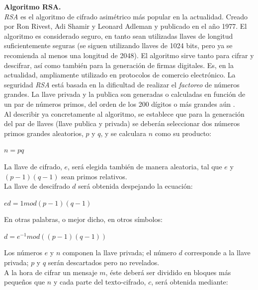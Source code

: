 \documentclass[12pt, a4paper, titlepage]{report}
\begin{document}
    		\textbf{Algoritmo RSA.}\\
    		\textit{RSA} es el algoritmo de cifrado asimétrico más popular en la actualidad. Creado por Ron Rivest, Adi Shamir y Leonard Adleman y publicado en el año 1977. El algoritmo es considerado seguro, en tanto sean utilizadas llaves de longitud suficientemente seguras (se siguen utilizando llaves de 1024 bits, pero ya se recomienda al menos una longitud de 2048). El algoritmo sirve tanto para cifrar y descifrar, así como también para la generación de firmas digitales. Es, en la actualidad, ampliamente utilizado en protocolos de comercio electrónico. La seguridad \textit{RSA} está basada en la dificultad de realizar el \textit{factoreo} de números grandes. La llave privada y la publica son generadas o calculadas en función de un par de números primos, del orden de los 200 dígitos o más grandes aún \cite{refCriptografia}. \\
    		Al describir ya concretamente al algoritmo, se establece que para la generación del par de llaves (llave publica y privada) se deberán seleccionar dos números primos grandes aleatorios, $p$ y $q$, y se calculara $n$ como su producto:
    		
    		\begin{center}
    		    $n=pq$
    		\end{center}
    		
    		La llave de cifrado, $e$, será elegida también de manera aleatoria, tal que $e$ y $(p-1)(q-1)$ sean primos relativos.\\
    		La llave de descifrado $d$ será obtenida despejando la ecuación:
    		
    		\begin{center}
    		    $ed=1 mod (p-1)(q-1)$
    		\end{center}
    		
    		En otras palabras, o mejor dicho, en otros símbolos:
    		
    		\begin{center}
    		    $d=e^{-1} mod ((p-1)(q-1))$
    		\end{center}
		    
		    Los números $e$ y $n$ componen la llave privada; el número $d$ corresponde a la llave privada; $p$ y $q$ serán descartados pero no revelados.\\
		    A la hora de cifrar un mensaje $m$, éste deberá ser dividido en bloques más pequeños que $n$ y cada parte del texto-cifrado, $c$, será obtenida mediante:
		    
\end{document}
